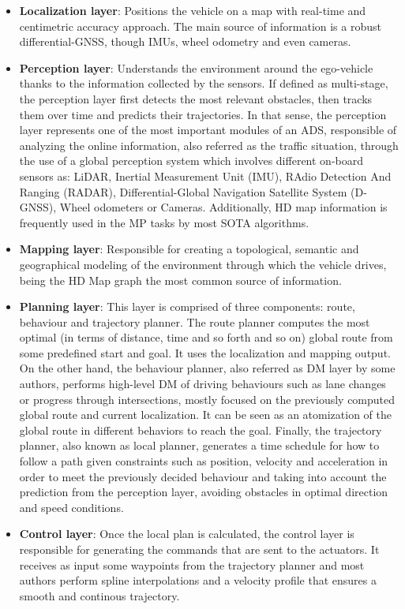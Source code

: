 \begin{itemize}
	
	\item \textbf{Localization layer}: Positions the vehicle on a map with real-time and centimetric accuracy approach. The main source of information is a robust differential-GNSS, though IMUs, wheel odometry and even cameras.
	
	\item \textbf{Perception layer}: Understands the environment around the ego-vehicle thanks to the information collected by the sensors. If defined as multi-stage, the perception layer first detects the most relevant obstacles, then tracks them over time and predicts their trajectories. In that sense, the perception layer represents one of the most important modules of an \ac{ADS}, responsible of analyzing the online information, also referred as the traffic situation, through the use of a global perception system which involves different on-board sensors as: \ac{LiDAR}, Inertial Measurement Unit (IMU), RAdio Detection And Ranging (RADAR), Differential-Global Navigation Satellite System (D-GNSS), Wheel odometers or Cameras. Additionally, HD map information is frequently used in the \ac{MP} tasks by most \ac{SOTA} algorithms.

	\item \textbf{Mapping layer}: Responsible for creating a topological, semantic and geographical modeling of the environment through which the vehicle drives, being the HD Map graph the most common source of information.
	
	\item \textbf{Planning layer}: This layer is comprised of three components: route, behaviour and trajectory planner. The route planner computes the most optimal (in terms of distance, time and so forth and so on) global route from some predefined start and goal. It uses the localization and mapping output. On the other hand, the behaviour planner, also referred as \ac{DM} layer by some authors, performs high-level \ac{DM} of driving behaviours such as lane changes or progress through intersections, mostly focused on the previously computed global route and current localization. It can be seen as an atomization of the global route in different behaviors to reach the goal. Finally, the trajectory planner, also known as local planner, generates a time schedule for how to follow a path given constraints such as position, velocity and acceleration in order to meet the previously decided behaviour and taking into account the prediction from the perception layer, avoiding obstacles in optimal direction and speed conditions.
	
	\item \textbf{Control layer}: Once the local plan is calculated, the control layer is responsible for generating the commands that are sent to the actuators. It receives as input some waypoints from the trajectory planner and most authors perform spline interpolations and a velocity profile that ensures a smooth and continous trajectory. 
	
\end{itemize}

